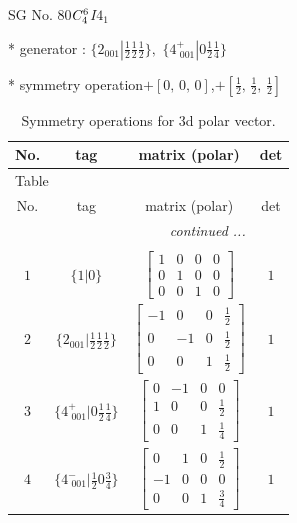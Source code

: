 \documentclass[fleqn,8pt]{jsarticle}
\begin{document}
\setcounter{MaxMatrixCols}{32}

\renewcommand{\tablename}{Table~}
\renewcommand{\figurename}{Figure~}
\begin{center}
\LARGE
SG No. 80\quad$C_{\rm 4}^{6}$\quad$I4_1$\quad[ tetragonal ]
\end{center}

* generator : $\{2{}_{001}|\frac{1}{2} \frac{1}{2} \frac{1}{2}\},\,\,\{4^{+}_{\,\,001}|0 \frac{1}{2} \frac{1}{4}\}$

* symmetry operation\quad$+\left[ 0,\, 0,\, 0 \right]$,\quad $+\left[ \frac{1}{2},\, \frac{1}{2},\, \frac{1}{2} \right]$
\renewcommand{\arraystretch}{1.3}
\begin{longtable}{cccc}
\caption{Symmetry operations for 3d polar vector.}
 \\
 \hline \hline
No. & tag & matrix (polar) & det \\ \hline \endfirsthead

\multicolumn{3}{l}{\tablename\ \thetable{}} \\
 \hline \hline
No. & tag & matrix (polar) & det \\ \hline \endhead

 \hline \hline
\multicolumn{3}{r}{\footnotesize\it continued ...} \\ \endfoot

 \hline \hline
\multicolumn{3}{r}{} \\ \endlastfoot

$ 1 $ & $ \{1|0\} $ & $ \begin{bmatrix} 1 & 0 & 0 & 0 \\ 0 & 1 & 0 & 0 \\ 0 & 0 & 1 & 0 \end{bmatrix} $ & $ 1 $ \\ \hline
$ 2 $ & $ \{2{}_{001}|\frac{1}{2} \frac{1}{2} \frac{1}{2}\} $ & $ \begin{bmatrix} -1 & 0 & 0 & \frac{1}{2} \\ 0 & -1 & 0 & \frac{1}{2} \\ 0 & 0 & 1 & \frac{1}{2} \end{bmatrix} $ & $ 1 $ \\ \hline
$ 3 $ & $ \{4^{+}_{\,\,001}|0 \frac{1}{2} \frac{1}{4}\} $ & $ \begin{bmatrix} 0 & -1 & 0 & 0 \\ 1 & 0 & 0 & \frac{1}{2} \\ 0 & 0 & 1 & \frac{1}{4} \end{bmatrix} $ & $ 1 $ \\ \hline
$ 4 $ & $ \{4^{-}_{\,\,001}|\frac{1}{2} 0 \frac{3}{4}\} $ & $ \begin{bmatrix} 0 & 1 & 0 & \frac{1}{2} \\ -1 & 0 & 0 & 0 \\ 0 & 0 & 1 & \frac{3}{4} \end{bmatrix} $ & $ 1 $ \\
\end{longtable}
\end{document}
